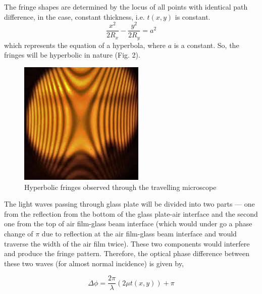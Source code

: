 The fringe shapes are determined by the locus of all points with identical path difference, in the case, constant thickness, i.e. $t(x,y)$ is constant.
\begin{equation}
    \frac{x^2}{2R_x}-\frac{y^2}{2R_y} = a^2
\end{equation}
which represents the equation of a hyperbola, where $a$ is a constant. So, the fringes will be hyperbolic in nature (Fig. 2).

\begin{figure}[H]
    \centering
    \label{fig:2}
    \includegraphics[width=1\columnwidth]{images/f3.jpg}
    \caption{Hyperbolic fringes observed through the travelling microscope}
\end{figure}

The light waves passing through glass plate will be divided into two parts --- one from the reflection from the bottom of the glass plate-air interface and the second one from the top of air film-glass
beam interface (which would under go a phase change of $\pi$ due to reflection at the air film-glass beam interface and would traverse the width of the air film twice). These two components would interfere and produce the fringe pattern.
Therefore, the optical phase difference between these two waves (for almost normal incidence) is
given by,

\begin{equation}
    \Delta \phi = \frac{2\pi}{\lambda}(2\mu t(x, y)) + \pi
\end{equation}

